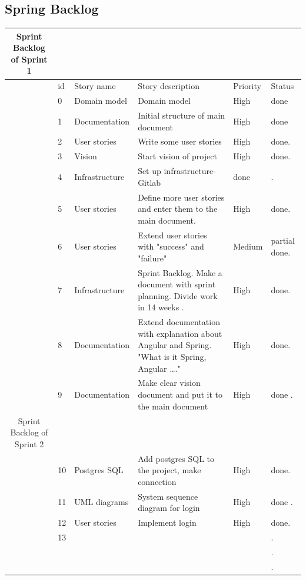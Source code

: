 \documentclass{scrartcl}
\begin{document}
\subsection{Spring Backlog}
\begin{table}[H]
    \centering
    \begin{tabular}{c@{\qquad}lllll}
   Sprint Backlog of Sprint 1\\
    
        \toprule
           & id & Story name & Story description & Priority & Status\\
        \midrule
        & 0 & Domain model & Domain model & High & done \\ \hline
        & 1 & Documentation  & Initial structure of main document & High & done \\ \hline
        
         &  2 &  User stories  & Write some user stories  & High & done. \\ \hline
          & 3 &  Vision &  Start vision of project & High  & done. \\ \hline
           & 4 & Infrastructure & Set up infrastructure- Gitlab & done & . \\ \hline
            & 5 &  User stories & Define more user stories and enter them to the main document. & High & done. \\ \hline
             & 6 & User stories & Extend user stories with "success" and "failure" & Medium & partial done. \\ \hline
              & 7 & Infrastructure & Sprint Backlog. Make a document with sprint planning. Divide work in 14 weeks .  & High &  done. \\ \hline
               & 8 & Documentation & Extend documentation with explanation about Angular and Spring. "What is it Spring, Angular …." & High & done. \\ \hline
               & 9 & Documentation & Make clear vision document and put it to the main document & High & done . \\ \hline
               
                Sprint Backlog of Sprint 2 \\
                 & 10 & Postgres SQL & Add postgres SQL to the project, make connection & High & done. \\ \hline
                  &  11& UML diagrams & System sequence diagram for login & High & done . \\ \hline
                   & 12 &  User stories &  Implement login & High & done. \\ \hline
                    & 13 &  &  &  & . \\ \hline
                     &  &  &  &  & . \\ \hline
                      &  &  &  &  & . \\ \hline
                    

\end{tabular}
\end{table}
\end{document}
